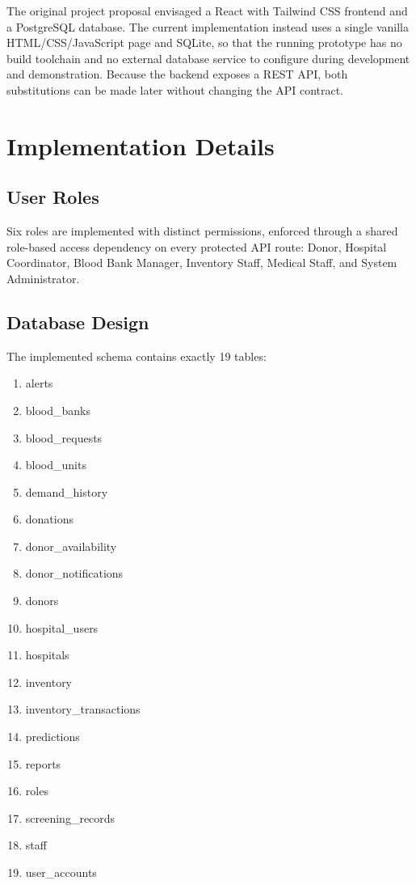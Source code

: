 \documentclass[12pt,twoside]{report}
\begin{document}
The original project proposal envisaged a React with Tailwind CSS frontend and a PostgreSQL database. The current implementation instead uses a single vanilla HTML/CSS/JavaScript page and SQLite, so that the running prototype has no build toolchain and no external database service to configure during development and demonstration. Because the backend exposes a REST API, both substitutions can be made later without changing the API contract.

\section{Implementation Details}

\subsection{User Roles}

Six roles are implemented with distinct permissions, enforced through a shared role-based access dependency on every protected API route: Donor, Hospital Coordinator, Blood Bank Manager, Inventory Staff, Medical Staff, and System Administrator.

\subsection{Database Design}

The implemented schema contains exactly 19 tables:

\begin{enumerate}[itemsep=0pt]
\item alerts
\item blood\_banks
\item blood\_requests
\item blood\_units
\item demand\_history
\item donations
\item donor\_availability
\item donor\_notifications
\item donors
\item hospital\_users
\item hospitals
\item inventory
\item inventory\_transactions
\item predictions
\item reports
\item roles
\item screening\_records
\item staff
\item user\_accounts
\end{enumerate}
\end{document}
